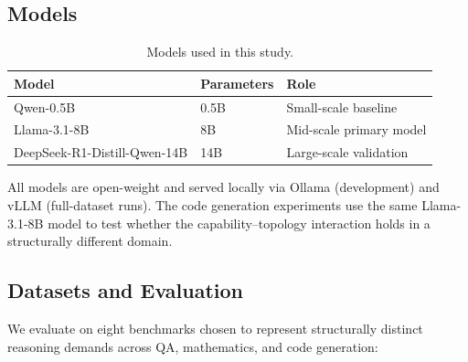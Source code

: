 \documentclass{article}
\begin{document}
\subsection{Models}
\label{sec:models}

\begin{table}[h]
\centering
\caption{Models used in this study.}
\label{tab:models}
\begin{tabular}{lll}
\toprule
Model & Parameters & Role \\
\midrule
Qwen-0.5B & 0.5B & Small-scale baseline \\
Llama-3.1-8B & 8B & Mid-scale primary model \\
DeepSeek-R1-Distill-Qwen-14B & 14B & Large-scale validation \\
\bottomrule
\end{tabular}
\end{table}

All models are open-weight and served locally via Ollama (development) and vLLM (full-dataset runs). The code generation experiments use the same Llama-3.1-8B model to test whether the capability--topology interaction holds in a structurally different domain.

\subsection{Datasets and Evaluation}
\label{sec:datasets}

We evaluate on eight benchmarks chosen to represent structurally distinct reasoning demands across QA, mathematics, and code generation:
\end{document}
